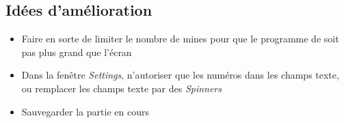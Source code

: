 \documentclass[a4paper, 10pt]{article}
\begin{document}
\subsection{Idées d'amélioration}
\begin{itemize}
\item Faire en sorte de limiter le nombre de mines pour que le programme de soit pas plus grand que l'écran
\item Dans la fenêtre \emph{Settings}, n'autoriser que les numéros dans les champs texte, ou remplacer les champs texte par des \emph{Spinners}
\item Sauvegarder la partie en cours
\end{itemize}
\end{document}
